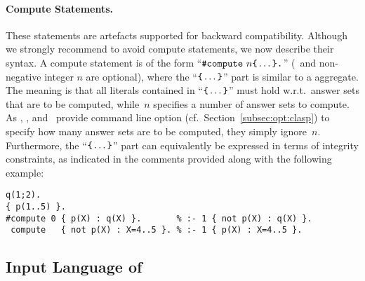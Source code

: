 \paragraph{Compute Statements.}
These statements are artefacts supported for backward compatibility.
Although we strongly recommend to avoid compute statements,
we now describe their syntax.
A compute statement is of the form
``$\const{\#compute}~n \code{\char`\{}\dots\code{\char`\}}\code{.}$''
(\code{\#}~and non-negative integer $n$ are optional),
where the ``$\code{\char`\{}\dots\code{\char`\}}$'' part
is similar to a  aggregate.
The meaning is that all literals contained in
``$\code{\char`\{}\dots\code{\char`\}}$'' must hold w.r.t.\ answer sets
that are to be computed,
while~$n$ specifies a number of answer sets to compute.
As \clasp, \clingo, and \iclingo\ provide command line option
 (cf.\ Section~\ref{subsec:opt:clasp})
to specify how many answer sets are to be computed,
they simply ignore~$n$.
Furthermore,
the ``$\code{\char`\{}\dots\code{\char`\}}$'' part can equivalently
be expressed in terms of integrity constraints,
as indicated in the comments provided along with the following example:
%
\begin{lstlisting}[xrightmargin=-20pt,numbers=none]
q(1;2).
{ p(1..5) }.
#compute 0 { p(X) : q(X) }.       % :- 1 { not p(X) : q(X) }.
 compute   { not p(X) : X=4..5 }. % :- 1 { p(X) : X=4..5 }.
\end{lstlisting}


\subsection{Input Language of \iclingo}\label{subsec:lang:iclingo}

